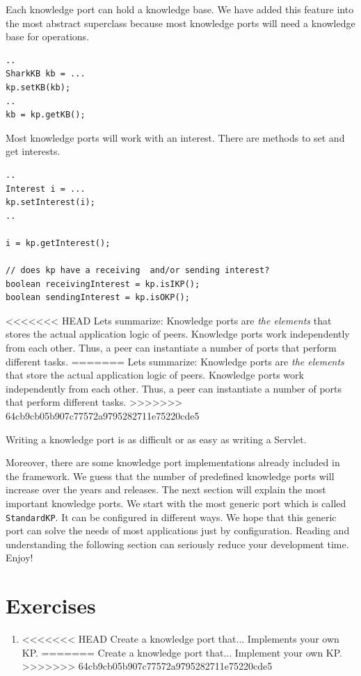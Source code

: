 Each knowledge port can hold a knowledge base. We have added this feature into the most abstract superclass because most knowledge ports will need a knowledge base for operations.

\begin{verbatim}
..
SharkKB kb = ...
kp.setKB(kb);
..
kb = kp.getKB();
\end{verbatim}

Most knowledge ports will work with an interest. There are methods to set and get interests.

\begin{verbatim}
..
Interest i = ...
kp.setInterest(i);
..

i = kp.getInterest();

// does kp have a receiving  and/or sending interest?
boolean receivingInterest = kp.isIKP();
boolean sendingInterest = kp.isOKP();
\end{verbatim}

<<<<<<< HEAD
Lets summarize: Knowledge ports are {\it the elements} that stores the actual application logic of peers. Knowledge ports work independently from each other. Thus, a peer can instantiate a number of ports that perform different tasks.
=======
Lets summarize: Knowledge ports are {\it the elements} that store the actual application logic of peers. Knowledge ports work independently from each other. Thus, a peer can instantiate a number of ports that perform different tasks.
>>>>>>> 64cb9cb05b907c77572a9795282711e75220cde5

Writing a knowledge port is as difficult or as easy as writing a Servlet. 

Moreover, there are some knowledge port implementations already included in the framework. We guess that the number of predefined knowledge ports will increase over the years and releases. The next section will explain the most important knowledge ports. We start with the most generic port which is called {\tt StandardKP}. It can be configured in different ways. We hope that this generic port can solve the needs of most applications just by configuration. Reading and understanding the following section can seriously reduce your development time. Enjoy!

\section{Exercises}

\begin{enumerate}
\item 
<<<<<<< HEAD
Create a knowledge port that... Implements your own KP.
=======
Create a knowledge port that... Implement your own KP.
>>>>>>> 64cb9cb05b907c77572a9795282711e75220cde5
\end{enumerate}
